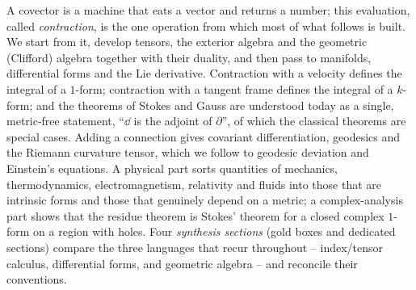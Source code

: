 \begin{center}
\begin{minipage}{0.88\textwidth}
\par\vspace{0.4em}
\small\raggedright\setlength{\parindent}{1.5em}\noindent
A covector is a machine that eats a vector and returns a number; this evaluation, called
\emph{contraction}, is the one operation from which most of what follows is built. We start from it,
develop tensors, the exterior algebra and the geometric (Clifford) algebra together with their duality,
and then pass to manifolds, differential forms and the Lie derivative. Contraction with a velocity
defines the integral of a $1$-form; contraction with a tangent frame defines the integral of a
$k$-form; and the theorems of Stokes and Gauss are understood today as a single, metric-free
statement, ``$\dd$ is the adjoint of $\partial$'', of which the classical theorems are special cases.
Adding a connection gives covariant differentiation, geodesics and the Riemann curvature tensor,
which we follow to geodesic deviation and Einstein's equations. A physical part sorts quantities
of mechanics, thermodynamics, electromagnetism, relativity and fluids into those that are intrinsic
forms and those that genuinely depend on a metric; a complex-analysis part shows that the residue
theorem is Stokes' theorem for a closed complex $1$-form on a region with holes. Four \emph{synthesis
sections} (gold boxes and dedicated sections) compare the three languages that recur throughout --
index/tensor calculus, differential forms, and geometric algebra -- and reconcile their conventions.
\end{minipage}
\end{center}
